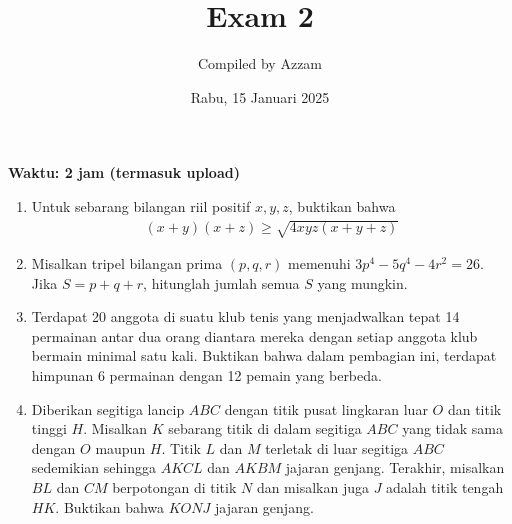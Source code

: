 \documentclass[12pt]{scrartcl}
\title{Exam 2}
\author{Compiled by Azzam}
\date{Rabu, 15 Januari 2025}
\begin{document}
\maketitle

\renewcommand*\contentsname{Daftar Isi}
\tableofcontents

\newpage
\textbf{Waktu: 2 jam (termasuk upload)}

\begin{enumerate}
    \item Untuk sebarang bilangan riil positif $x,y,z$, buktikan bahwa
    \begin{align*}
        (x+y)(x+z) \ge \sqrt{4xyz(x+y+z)}
    \end{align*}

    \item Misalkan tripel bilangan prima $(p,q,r)$ memenuhi $3p^4-5q^4-4r^2=26$. Jika $S = p+q+r$, hitunglah jumlah semua $S$ yang mungkin.

    \item Terdapat 20 anggota di suatu klub tenis yang menjadwalkan tepat 14 permainan antar dua orang diantara mereka dengan setiap anggota klub bermain minimal satu kali. Buktikan bahwa dalam pembagian ini, terdapat himpunan 6 permainan dengan 12 pemain yang berbeda.

    \item Diberikan segitiga lancip $ABC$ dengan titik pusat lingkaran luar $O$ dan titik tinggi $H$. Misalkan $K$ sebarang titik di dalam segitiga $ABC$ yang tidak sama dengan $O$ maupun $H$. Titik $L$ dan $M$ terletak di luar segitiga $ABC$ sedemikian sehingga $AKCL$ dan $AKBM$ jajaran genjang. Terakhir, misalkan $BL$ dan $CM$ berpotongan di titik $N$ dan misalkan juga $J$ adalah titik tengah $HK$. Buktikan bahwa $KONJ$ jajaran genjang.

\end{enumerate}
\end{document}
